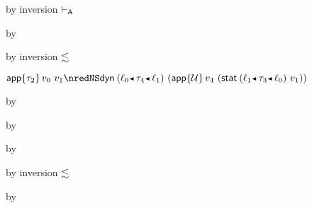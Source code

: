{\begin{lamportproof*}
    \begin{pfproof}
        \begin{pfproof}
          by inversion $\vdash_{\mathsf{A}}$
        \end{pfproof}
        \begin{pfproof}
          by 
        \end{pfproof}
        \begin{pfproof}
          by inversion $\lesssim$
        \end{pfproof}
      \qedstep
        \begin{pfproof}
          \(\eapp{\stype_2}{\svalue_0}{\svalue_1} \nredNS \edynb{\obnd{\sowner_0}{\stype_4}{\sowner_1}}{(\eapp{\tdyn}{\svalue_4}{(\estab{\obnd{\sowner_1}{\stype_3}{\sowner_0}}{\svalue_1})})}\)
        \end{pfproof}
    \end{pfproof}

    \begin{pfproof}
        \begin{pfproof}
          by 
        \end{pfproof}
      \qedstep
        \begin{pfproof}
          by 
        \end{pfproof}
    \end{pfproof}

    \begin{pfproof}
        \begin{pfproof}
          by 
        \end{pfproof}
        \begin{pfproof}
          by inversion $\lesssim$
        \end{pfproof}
      \qedstep
        \begin{pfproof}
          by 
        \end{pfproof}
    \end{pfproof}


\end{lamportproof*}}
